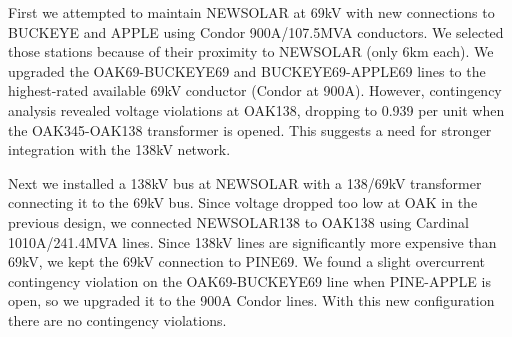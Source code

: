 \documentclass[conference]{IEEEtran}
\begin{document}
First we attempted to maintain NEWSOLAR at 69kV with new connections to BUCKEYE and APPLE using Condor 900A/107.5MVA conductors. We selected those stations because of their proximity to NEWSOLAR (only 6km each). We upgraded the OAK69-BUCKEYE69 and BUCKEYE69-APPLE69 lines to the highest-rated available 69kV conductor (Condor at 900A). However, contingency analysis revealed voltage violations at OAK138, dropping to 0.939 per unit when the OAK345-OAK138 transformer is opened. This suggests a need for stronger integration with the 138kV network.

Next we installed a 138kV bus at NEWSOLAR with a 138/69kV transformer connecting it to the 69kV bus. Since voltage dropped too low at OAK in the previous design, we connected NEWSOLAR138 to OAK138 using Cardinal 1010A/241.4MVA lines. Since 138kV lines are significantly more expensive than 69kV, we kept the 69kV connection to PINE69. We found a slight overcurrent contingency violation on the OAK69-BUCKEYE69 line when PINE-APPLE is open, so we upgraded it to the 900A Condor lines. With this new configuration there are no contingency violations.
\end{document}
